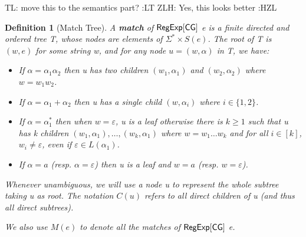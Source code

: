 \documentclass[sigplan,review,anonymous]{acmart}\settopmatter{printfolios=true,printccs=false,printacmref=false}
\newcommand{\tl}[1]{\color{blue} {TL: #1 :LT} \color{black}}
\newcommand{\zhilei}[1]{\color{green} {ZLH: #1 :HZL} \color{black}}
\newcommand{\tl}[1]{}
\newcommand{\zhilei}[1]{}
\newcommand{\tmtextbf}[1]{{\bfseries{#1}}}
\newtheorem{definition}{Definition}
\begin{document}
\tl{move this to the semantics part?}
\zhilei{Yes, this looks better}

\begin{definition}[Match Tree]
  A \tmtextbf{match} of ${\sf RegExp}[\sf CG]$ e is a finite directed and ordered
  tree T, whose nodes are elements of $\Sigma^{\ast} \times S (e)$. The root
  of T is $(w, e)$ for some string w, and for any node $u = (w, \alpha)$ in T,
  we have:
  \begin{itemize}
    \item If $\alpha = \alpha_1 \alpha_2$ then u has two children $(w_1,
    \alpha_1)$ and $(w_2, \alpha_2)$ where $w = w_1 w_2$.
    
    \item If $\alpha = \alpha_1 + \alpha_2$ then u has a single child $(w,
    \alpha_i)$ where $i \in \{ 1, 2 \}$.
    
    \item If $\alpha = \alpha_1^{\ast}$ then when $w = \varepsilon$, u is a
    leaf otherwise there is $k \geqslant 1$ such that u has k children $(w_1,
    \alpha_1), \ldots, (w_k, \alpha_1)$ where $w = w_1 \ldots w_k$ and for all
    $i \in [k]$, $w_i \neq \varepsilon$, even if $\varepsilon \in L
    (\alpha_1)$.
    
    \item If $\alpha = a$ (resp. $\alpha = \varepsilon$) then u is a leaf and
    $w = a$ (resp. $w = \varepsilon$).
  \end{itemize}
 
  Whenever unambiguous, we will use a node u to represent the whole subtree
  taking u as root. The notation $C (u)$ refers to all direct children of u
  (and thus all direct subtrees).
  
  We also use $M (e)$ to denote all the matches of ${\sf RegExp}[\sf CG]$ e.
\end{definition}
\end{document}
